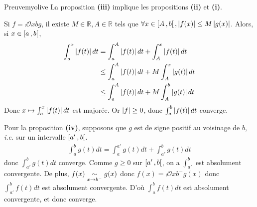     \begin{demo}{Preuve}{myolive}
        La proposition \textbf{(iii)} implique les propositions \textbf{(ii)} et \textbf{(i)}. 

        Si $f = \comp{\mathcal{O}}{x}{b}{g}$, il existe $M \in \mathbb{R}, A \in \mathbb{R}$ tels que $\forall x \in \left[ A \, , b \right[, \left\lvert f(x)\right\rvert \leq M \left\lvert g(x)\right\rvert$. Alors, si $x \in \left[ a \, , b \right[$, 
        \begin{align*}
            \int_{a}^{x} \left\lvert f(t)\right\rvert dt 
            &= \int_{a}^{A} \left\lvert f(t)\right\rvert dt + \int_{A}^{x} \left\lvert f(t)\right\rvert dt \\
            &\leq \int_{a}^{A} \left\lvert f(t)\right\rvert dt + M \int_{A}^{x} \left\lvert g(t)\right\rvert dt \\
            &\leq \int_{a}^{A} \left\lvert f(t)\right\rvert dt + M \int_{A}^{b} \left\lvert g(t)\right\rvert dt
        \end{align*}
        Donc $x \mapsto \int_{a}^{x} \left\lvert f(t)\right\rvert dt$ est majorée. Or $\left\lvert f\right\rvert \geq 0$, donc $\int_{a}^{b} \left\lvert f(t)\right\rvert dt$ converge.

        Pour la proposition \textbf{(iv)}, supposons que $g$ est de signe positif au voisinage de $b$, \textit{i.e.} sur un intervalle $\left[ a' \, , b \right[$.
        \begin{align*}
            \int_{a}^{b} g(t)dt = \int_{a}^{a'} g(t)dt + \int_{a'}^{b} g(t)dt 
        \end{align*}
        donc $\int_{a'}^{b} g(t)dt$ converge. Comme $g \geq 0$ sur $\left[ a' \, , b \right[$, on a $\int_{a'}^{b}$ est absolument convergente. De plus, $f(x) \underset{x \rightarrow b^-}{\sim} g(x)$ donc $f(x) = \comp{\mathcal{O}}{x}{b^-}{g(x)}$ donc $\int_{a'}^{b} f(t)dt$ est absolument convergente. D’où $\int_{a}^{b } f(t)dt$ est absolument convergente, et donc converge.
    \end{demo}

